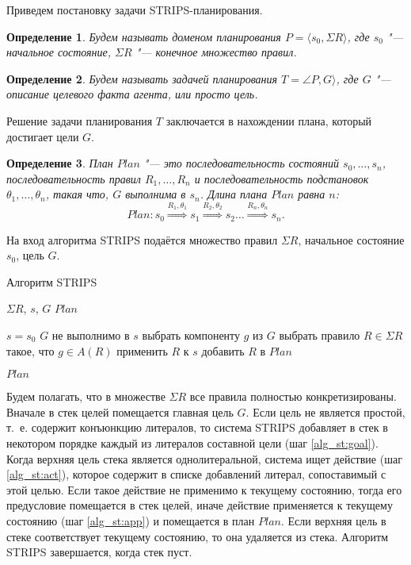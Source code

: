 \documentclass[b5paper,11pt]{book}
\newtheorem{Def}{Определение}
\begin{document}
	Приведем постановку задачи STRIPS-планирования.
	
	\begin{Def}
		Будем называть доменом планирования $P = \langle s_0, \Sigma R\rangle$, где $s_0$ "--- начальное состояние, $\Sigma R$ "--- конечное множество правил.
	\end{Def}
	\begin{Def}
		Будем называть задачей планирования $T = \angle P, G\rangle$, где $G$ "--- описание целевого факта агента, или просто цель.
	\end{Def}

	Решение задачи планирования $T$ заключается в нахождении плана, который достигает цели $G$.
	\begin{Def}
		План $Plan$ "--- это последовательность состояний $s_0,\dots,s_n$, последовательность правил $R_1,\dots,R_n$ и последовательность подстановок $\theta_1,\dots,\theta_n$, такая что, $G$ выполнима в $s_n$. Длина плана $Plan$ равна $n$:
		\[
			Plan: s_0 \overset{R_1,\theta_1}{\Rightarrow} s_1 \overset{R_2,\theta_2}{\Rightarrow} s_2 \dots \overset{R_n,\theta_n}{\Rightarrow} s_n.
		\]
	\end{Def}
	
	На вход алгоритма STRIPS подаётся множество правил $\Sigma R$, начальное состояние $s_0$, цель $G$.
	
	\begin{algorithm}[H]
		\caption{Алгоритм STRIPS}\label{alg:strips}
		\begin{algorithmic}[1]
			\Require $\Sigma R$, $s$, $G$
			\Ensure $Plan$
			
			\State $s=s_0$
			\While $G$ не выполнимо в $s$
				\State выбрать компоненту $g$ из $G$ \label{alg_st:goal}
				\State выбрать правило $R\in\Sigma R$ такое, что $g\in A(R)$ \label{alg_st:act}
				\State {}
				\State применить $R$ к $s$ \label{alg_st:app}
				\State добавить $R$ в $Plan$
			\EndWhile
			
			\Return $Plan$
		\end{algorithmic}
	\end{algorithm}

	Будем полагать, что в множестве $\Sigma R$ все правила полностью конкретизированы. Вначале в стек целей помещается главная цель $G$. Если цель не является простой, т.~е. содержит конъюнкцию литералов, то система STRIPS добавляет в стек в некотором порядке каждый из литералов составной цели (шаг \autoref{alg_st:goal}). Когда верхняя цель стека является однолитеральной, система ищет действие (шаг \autoref{alg_st:act}), которое содержит в списке добавлений литерал, сопоставимый с этой целью. Если такое действие не применимо к текущему состоянию, тогда его предусловие помещается в стек целей, иначе действие применяется к текущему состоянию (шаг \autoref{alg_st:app}) и помещается в план $Plan$. Если верхняя цель в стеке соответствует текущему состоянию, то она удаляется из стека. Алгоритм STRIPS завершается, когда стек пуст.
	
\end{document}
